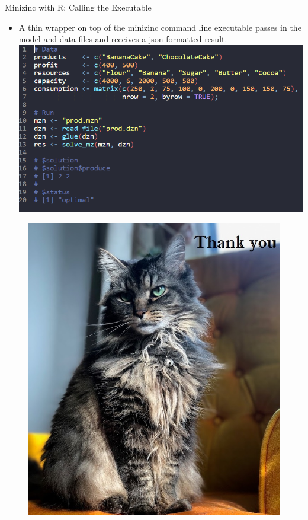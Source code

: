 \documentclass[xcolor=dvipsnames,aspectratio=169]{beamer}
\begin{document}
\begin{frame}{Minizinc with R: Calling the Executable}
   \begin{itemize}
    \item A thin wrapper on top of the minizinc command line executable passes in the model and data files and receives a json-formatted result. 
    \includegraphics[scale = 0.60]{mz_production_result.png} 
   \end{itemize}
    
\end{frame}

\begin{frame}
\begin{figure}
    \centering
   \includegraphics[scale = 0.35]{thankyou.JPG}
\end{figure}
\end{frame} 
\end{document}
